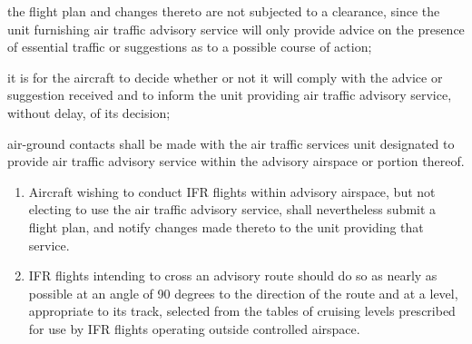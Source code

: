 \begin{enumeratesc}
\begin{enumeratescit}
        \begin{enumalph}
            \item the flight plan and changes thereto are not subjected to a clearance, since the unit furnishing air traffic advisory service will only provide advice on the presence of essential traffic or suggestions as to a possible course of action;
            \item it is for the aircraft to decide whether or not it will comply with the advice or suggestion received and to inform the unit providing air traffic advisory service, without delay, of its decision;
            \item air-ground contacts shall be made with the air traffic services unit designated to provide air traffic advisory service within the advisory airspace or portion thereof.
        \end{enumalph}

         \label{9.1.4.2.2}
        \begin{enumerate}
            \item Aircraft wishing to conduct IFR flights within advisory airspace, but not electing to use the air traffic advisory service, shall nevertheless submit a flight plan, and notify changes made thereto to the unit providing that service.
            \item IFR flights intending to cross an advisory route should do so as nearly as possible at an angle of 90 degrees to the direction of the route and at a level, appropriate to its track, selected from the tables of cruising levels prescribed for use by IFR flights operating outside controlled airspace.
        \end{enumerate}
    \end{enumeratescit}


\end{enumeratesc}
